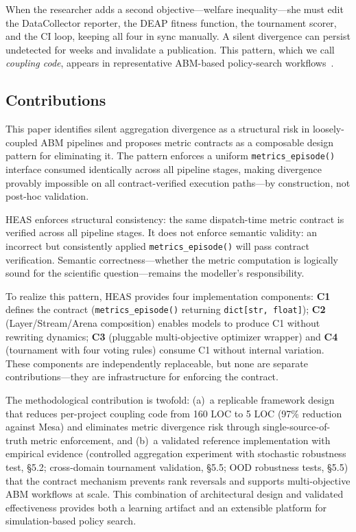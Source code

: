 \documentclass{wscpaperproc}
\begin{document}
When the researcher adds a second objective---welfare inequality---she must edit
the DataCollector reporter, the DEAP fitness function, the tournament scorer, and
the CI loop, keeping all four in sync manually. A silent divergence can persist
undetected for weeks and invalidate a publication. This pattern, which we call
\emph{coupling code}, appears in representative ABM-based policy-search
workflows~\cite{pangallo2019best,capri2023transport}.

\subsection{Contributions}
\label{sec:intro-contributions}

This paper identifies silent
aggregation divergence as a structural risk in loosely-coupled ABM pipelines and
proposes metric contracts as a composable design pattern for eliminating it. The
pattern enforces a uniform \texttt{metrics\_episode()} interface consumed identically
across all pipeline stages, making divergence provably impossible on all
contract-verified execution paths---by construction, not post-hoc validation.

HEAS enforces structural consistency: the same dispatch-time metric contract is
verified across all pipeline stages. It does not enforce semantic validity: an
incorrect but consistently applied \texttt{metrics\_episode()} will pass contract
verification. Semantic correctness---whether the metric computation is logically
sound for the scientific question---remains the modeller's responsibility.

To realize this pattern, HEAS provides four implementation components:
\textbf{C1} defines the contract (\texttt{metrics\_episode()} returning
\texttt{dict[str, float]}); \textbf{C2} (Layer/Stream/Arena composition) enables
models to produce C1 without rewriting dynamics; \textbf{C3} (pluggable multi-objective
optimizer wrapper) and \textbf{C4} (tournament with four voting rules) consume C1
without internal variation. These components are independently replaceable, but none
are separate contributions---they are infrastructure for enforcing the contract.

The methodological contribution is twofold: (a)~a replicable framework design that
reduces per-project coupling code from 160 LOC to 5 LOC (97\% reduction against Mesa)
and eliminates metric divergence risk through single-source-of-truth metric enforcement, and (b)~a validated reference
implementation with empirical evidence (controlled aggregation experiment with stochastic robustness test, \S5.2;
cross-domain tournament validation, \S5.5; OOD robustness tests, \S5.5) that the
contract mechanism prevents rank reversals and supports multi-objective ABM workflows
at scale. This combination of architectural design and validated effectiveness provides
both a learning artifact and an extensible platform for simulation-based policy search.
\end{document}
